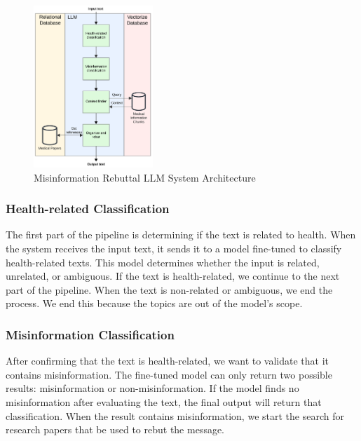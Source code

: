 \begin{figure}[h]
	\begin{center}
		\includegraphics[width=0.4\textwidth]{figures/LLM_Pipeline} %
	\end{center}
	\caption{Misinformation Rebuttal LLM System Architecture} %
	\label{fig:llm}
\end{figure}


\subsubsection{Health-related Classification}
The first part of the pipeline is determining if the text is related to health. When the system receives the input text, it sends it to a model fine-tuned to classify health-related texts. This model determines whether the input is related, unrelated, or ambiguous.
If the text is health-related, we continue to the next part of the pipeline. When the text is non-related or ambiguous, we end the process. We end this because the topics are out of the model's scope. 

\subsubsection{Misinformation Classification}
After confirming that the text is health-related, we want to validate that it contains misinformation. The fine-tuned model can only return two possible results: misinformation or non-misinformation. If the model finds no misinformation after evaluating the text,
the final output will return that classification. When the result contains misinformation, we start the search for research papers that be used to rebut the message.

